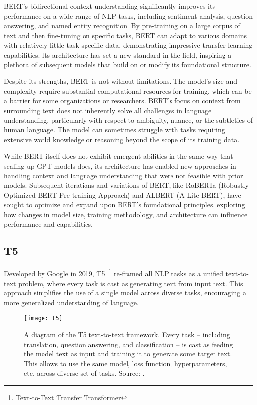 BERT's bidirectional context understanding significantly improves its performance on a wide range of NLP tasks, including sentiment analysis, question answering, and named entity recognition.
By pre-training on a large corpus of text and then fine-tuning on specific tasks, BERT can adapt to various domains with relatively little task-specific data, demonstrating impressive transfer learning capabilities.
Its architecture has set a new standard in the field, inspiring a plethora of subsequent models that build on or modify its foundational structure.

Despite its strengths, BERT is not without limitations.
The model's size and complexity require substantial computational resources for training, which can be a barrier for some organizations or researchers.
BERT's focus on context from surrounding text does not inherently solve all challenges in language understanding, particularly with respect to ambiguity, nuance, or the subtleties of human language.
The model can sometimes struggle with tasks requiring extensive world knowledge or reasoning beyond the scope of its training data.

While BERT itself does not exhibit emergent abilities in the same way that scaling up GPT models does, its architecture has enabled new approaches in handling context and language understanding that were not feasible with prior models.
Subsequent iterations and variations of BERT, like RoBERTa (Robustly Optimized BERT Pre-training Approach) and ALBERT (A Lite BERT), have sought to optimize and expand upon BERT's foundational principles, exploring how changes in model size, training methodology, and architecture can influence performance and capabilities.

\subsection{T5}
\label{subsec:t5}

Developed by Google in 2019, T5~\footnote{Text-to-Text Transfer Transformer} re-framed all NLP tasks as a unified text-to-text problem, where every task is cast as generating text from input text.
This approach simplifies the use of a single model across diverse tasks, encouraging a more generalized understanding of language.

\begin{figure}[h!]
	\centering
	\texttt{[image: t5]}
	\caption{A diagram of the T5 text-to-text framework. Every task -- including translation, question answering, and classification -- is cast as feeding the model text as input and training it to generate some target text. This allows to use the same model, loss function, hyperparameters, etc. across diverse set of tasks. Source: \protect\textcite{raffel2023exploring}.}
	\label{fig:t5-t2t}
\end{figure}

